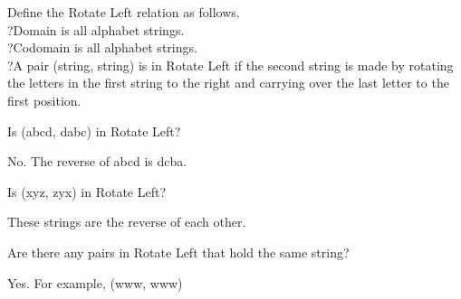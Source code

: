\documentclass{ximera}
\begin{document}
\begin{question}

Define the Rotate Left relation as follows. \\?Domain is all alphabet strings. \\?Codomain is all alphabet strings. \\?A pair (string, string) is in Rotate Left if the second string is made by rotating the letters in the first string to the right and carrying over the last letter to the first position.


Is (abcd, dabc) in Rotate Left?
\begin{multipleChoice}
\end{multipleChoice}
\begin{feedback}
No. The reverse of abcd is dcba.
\end{feedback}


Is (xyz, zyx) in Rotate Left?
\begin{multipleChoice}
\end{multipleChoice}
\begin{feedback}
These strings are the reverse of each other.
\end{feedback}


Are there any pairs in Rotate Left that hold the same string?
\begin{multipleChoice}
\end{multipleChoice}
\begin{feedback}
Yes. For example, (www, www)
\end{feedback}

\end{question}
\end{document}

